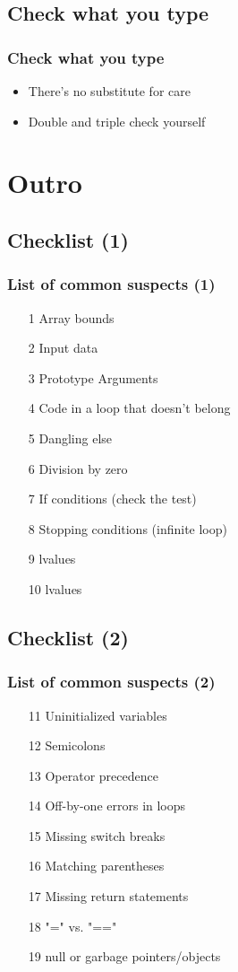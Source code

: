 \documentclass{beamer}
\begin{document}
\subsection{Check what you type}
\frame
{
    \frametitle{Check what you type}

    \begin{itemize}
        \item There's no substitute for care
        \item Double and triple check yourself
    \end{itemize}
}

\section{Outro}
\subsection{Checklist (1)}
\frame
{
    \frametitle{List of common suspects (1)}

    \begin{enumerate}
        \item[1] Array bounds
        \item[2] Input data
        \item[3] Prototype Arguments
        \item[4] Code in a loop that doesn't belong
        \item[5] Dangling else
        \item[6] Division by zero
        \item[7] If conditions (check the test)
        \item[8] Stopping conditions (infinite loop)
        \item[9] lvalues
        \item[10] lvalues
    \end{enumerate}
}
\subsection{Checklist (2)}
\frame
{
    \frametitle{List of common suspects (2)}

    \begin{enumerate}
        \item[11] Uninitialized variables
        \item[12] Semicolons
        \item[13] Operator precedence
        \item[14] Off-by-one errors in loops
        \item[15] Missing switch breaks
        \item[16] Matching parentheses
        \item[17] Missing return statements
        \item[18] "=" vs. "=="
        \item[19] null or garbage pointers/objects
    \end{enumerate}
}
\end{document}
